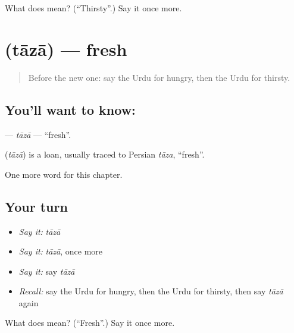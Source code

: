 \begin{tcolorbox}[breakable,colback=teal!4,colframe=teal!35!black,title={Before you move on}]
What does  mean? (\textquotedblleft{}Thirsty\textquotedblright{}.) Say it once more.
\end{tcolorbox}
\section[\texorpdfstring{\ur{تازہ} (tāzā)}{تازہ (tāzā)}]{ (tāzā) — fresh}

\label{lesson:UR-C136-taza}



\begin{quote}
Before the new one: say the Urdu for hungry, then the Urdu for thirsty.
\end{quote}

\subsection*{You'll want to know: }
\textbf{} — \emph{tāzā} — \textquotedblleft{}fresh\textquotedblright{}.

\begin{cousinweb}
\textbf{} (\emph{tāzā}) is a loan, usually traced to Persian \emph{tāza}, \textquotedblleft{}fresh\textquotedblright{}.
\end{cousinweb}

\begin{grammarlens}[title={What you've built}]
One more word for this chapter.
\end{grammarlens}

\subsection*{Your turn}
\begin{itemize}
\raggedright
  \item \emph{Say it:} \emph{tāzā}
  \item \emph{Say it:} \emph{tāzā}, once more
  \item \emph{Say it:} say \emph{tāzā}
  \item \emph{Recall:} say the Urdu for hungry, then the Urdu for thirsty, then say \emph{tāzā} again
\end{itemize}

\begin{tcolorbox}[breakable,colback=teal!4,colframe=teal!35!black,title={Before you move on}]
What does  mean? (\textquotedblleft{}Fresh\textquotedblright{}.) Say it once more.
\end{tcolorbox}
